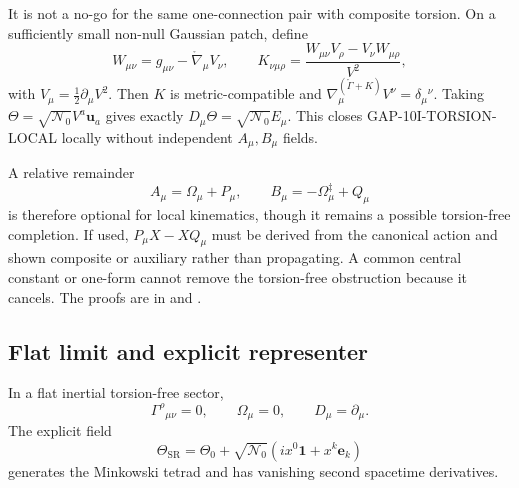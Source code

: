 It is not a no-go for the same one-connection pair with composite torsion.  On
a sufficiently small non-null Gaussian patch, define
\begin{equation}
 W_{\mu\nu}=g_{\mu\nu}-\mathring\nabla_\mu V_\nu,
 \qquad
 K_{\nu\mu\rho}
 =\frac{W_{\mu\nu}V_\rho-V_\nu W_{\mu\rho}}{V^2},
\end{equation}
with $V_\mu=\tfrac12\partial_\mu V^2$.  Then $K$ is metric-compatible and
$\nabla^{(\mathring\Gamma+K)}_\mu V^\nu=\delta_\mu{}^\nu$.  Taking
$\Theta=\sqrt{\mathcal N_0}V^a\mathbf u_a$ gives exactly
$D_\mu\Theta=\sqrt{\mathcal N_0}E_\mu$.  This closes
GAP-10I-TORSION-LOCAL locally without independent $A_\mu,B_\mu$ fields.

A relative remainder
\begin{equation}
 A_\mu=\Omega_\mu+P_\mu,
 \qquad
 B_\mu=-\Omega_\mu^\ddagger+Q_\mu
\end{equation}
is therefore optional for local kinematics, though it remains a possible
torsion-free completion.  If used, $P_\mu X-XQ_\mu$ must be derived from the
canonical action and shown composite or auxiliary rather than propagating.  A
common central constant or one-form cannot remove the torsion-free obstruction
because it cancels.  The proofs are in
 and
.

\subsection{Flat limit and explicit representer}
In a flat inertial torsion-free sector,
\begin{equation}
 \Gamma^\rho{}_{\mu\nu}=0,
 \qquad \Omega_\mu=0,
 \qquad D_\mu=\partial_\mu.
\end{equation}
The explicit field
\begin{equation}
 \Theta_{\mathrm{SR}}=\Theta_0+\sqrt{\mathcal N_0}
 (i x^0\mathbf1+x^k\mathbf e_k)
\end{equation}
generates the Minkowski tetrad and has vanishing second spacetime derivatives.


